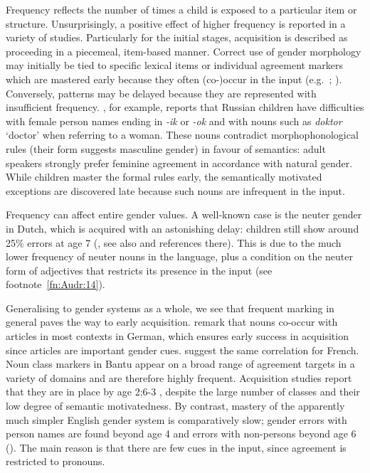 \documentclass[output=collectionpaper]{langsci/langscibook}
\begin{document}
Frequency reflects the number of times a child is exposed to a particular item or structure. Unsurprisingly, a positive effect of higher frequency is reported in a variety of studies. Particularly for the initial stages, acquisition is described as proceeding in a piecemeal, item-based manner. Correct use of gender morphology may initially be tied to specific lexical items or individual agreement markers which are mastered early because they often (co-)occur in the input (e.g.\ \citealt{Mariscal2009,Szagun2007}; \citealt[115]{Mills1986}). Conversely, patterns may be delayed because they are represented with insufficient frequency. \citet{Rodina2014}, for example, reports that Russian children have difficulties with female person names ending in \textit{-ik} or \textit{-ok} and with nouns such as \textit{doktor} `doctor' when referring to a woman. These nouns contradict morphophonological rules (their form suggests masculine gender) in favour of semantics: adult speakers strongly prefer feminine agreement in accordance with natural gender. While children master the formal rules early, the semantically motivated exceptions are discovered late because such nouns are infrequent in the input.

Frequency can affect entire gender values. A well-known case is the neuter gender in Dutch, which is acquired with an astonishing delay: children still show around 25\% errors at age 7 (\citealt{Blom2008}, see also \citealt{Keij2012} and references there). This is due to the much lower frequency of neuter nouns in the language, plus a condition on the neuter form of adjectives that restricts its presence in the input (see footnote~\ref{fn:Audr:14}).

Generalising to gender systems as a whole, we see that frequent marking in general paves the way to early acquisition. \citet{Szagun2007} remark that nouns co-occur with articles in most contexts in German, which ensures early success in acquisition since articles are important gender cues. \citet{Eichler2013} suggest the same correlation for French. Noun class markers in Bantu appear on a broad range of agreement targets in a variety of domains and are therefore highly frequent. Acquisition studies report that they are in place by age 2;6-3 \citep{Demuth2003}, despite the large number of classes and their low degree of semantic motivatedness. By contrast, mastery of the apparently much simpler English gender system is comparatively slow; gender errors with person names are found beyond age 4 and errors with non-persons beyond age 6 (\citealt[91, 103]{Mills1986}). The main reason is that there are few cues in the input, since agreement is restricted to pronouns.
\end{document}
